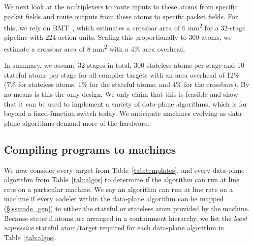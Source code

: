 We next look at the multiplexers to route inputs to these atoms from specific
packet fields and route outputs from these atoms to specific packet fields. For
this, we rely on RMT~\cite{rmt}, which estimates a crossbar area of 6 \si{\milli\metre\squared}
for a 32-stage pipeline with 224 action units. Scaling this proportionally to
300 atoms, we estimate a crossbar area of 8 \si{\milli\metre\squared} with a 4\% area
overhead.

In summary, we assume 32 stages in total, 300 stateless atoms per stage and 10
stateful atoms per stage for all compiler targets with an area overhead of 12\%
(7\% for stateless atoms, 1\% for the stateful atoms, and 4\% for the
crossbars). By no means is this the only design. We only claim that this is
feasible and show that it can be used to implement a variety of data-plane
algorithms, which is far beyond a fixed-function switch today. We anticipate
\absmachine machines evolving as data-plane algorithms demand more of
the hardware.

\subsection{Compiling \pktlanguage programs to \absmachine machines}
\label{ss:compiler}
We now consider every target from Table~\ref{tab:templates}, and every
data-plane algorithm from Table~\ref{tab:algos} to determine if the algorithm
can run at line rate on a particular \absmachine machine. We say an algorithm
can run at line rate on a \absmachine machine if every codelet within the
data-plane algorithm can be mapped (\S\ref{ss:code_gen}) to either the stateful
or stateless atom provided by the \absmachine machine. Because stateful atoms
are arranged in a containment hierarchy, we list the \textit{least expressive}
stateful atom/target required for each data-plane algorithm in
Table~\ref{tab:algos}.

